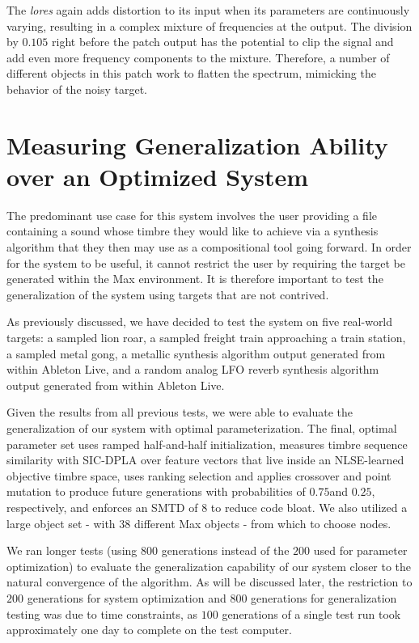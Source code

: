 \documentclass[a4paper,12pt]{report} 	%
\numberwithin{figure}{chapter}
\numberwithin{table}{chapter}
\numberwithin{equation}{chapter}
\begin{document}
\begin{flushleft}
The \emph{lores\texttildelow{}} again adds distortion to its input when its parameters are continuously varying, resulting in a complex mixture of frequencies at the output. The division by $0.105$ right before the patch output has the potential to clip the signal and add even more frequency components to the mixture. Therefore, a number of different objects in this patch work to flatten the spectrum, mimicking the behavior of the noisy target.

\clearpage
\section{Measuring Generalization Ability over an Optimized System}

The predominant use case for this system involves the user providing a file containing a sound whose timbre they would like to achieve via a synthesis algorithm that they then may use as a compositional tool going forward. In order for the system to be useful, it cannot restrict the user by requiring the target be generated within the Max environment. It is therefore important to test the generalization of the system using targets that are not contrived.

As previously discussed, we have decided to test the system on five real-world targets: a sampled lion roar, a sampled freight train approaching a train station, a sampled metal gong, a metallic synthesis algorithm output generated from within Ableton Live, and a random analog LFO reverb synthesis algorithm output generated from within Ableton Live.

Given the results from all previous tests, we were able to evaluate the generalization of our system with optimal parameterization. The final, optimal parameter set uses ramped half-and-half initialization, measures timbre sequence similarity with SIC-DPLA over feature vectors that live inside an NLSE-learned objective timbre space, uses ranking selection and applies crossover and point mutation to produce future generations with probabilities of $0.75$and $0.25$, respectively, and enforces an SMTD of $8$ to reduce code bloat. We also utilized a large object set - with $38$ different Max objects - from which to choose nodes.

We ran longer tests (using $800$ generations instead of the $200$ used for parameter optimization) to evaluate the generalization capability of our system closer to the natural convergence of the algorithm. As will be discussed later, the restriction to $200$ generations for system optimization and $800$ generations for generalization testing was due to time constraints, as $100$ generations of a single test run took approximately one day to complete on the test computer. 


\end{flushleft}
\end{document}
